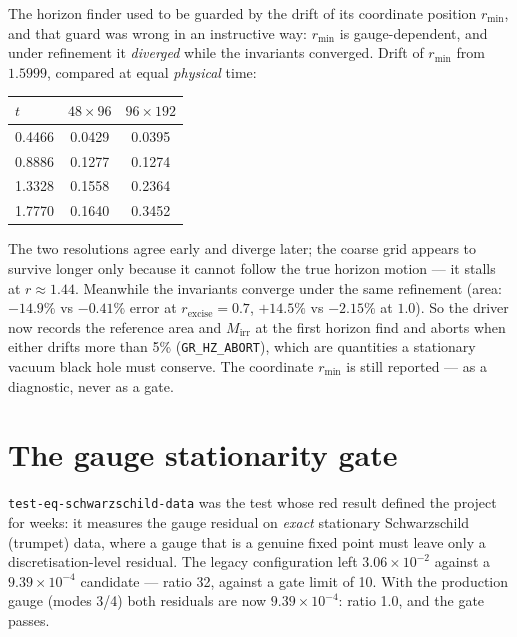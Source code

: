 \documentclass[11pt,openany]{book}
\begin{document}
The horizon finder used to be guarded by the drift of its coordinate
position $r_{\min}$, and that guard was wrong in an instructive way: $r_{\min}$
is gauge-dependent, and under refinement it \emph{diverged} while the
invariants converged. Drift of $r_{\min}$ from $1.5999$, compared at equal
\emph{physical} time:

\begin{center}
\begin{tabular}{@{}lcc@{}}
\toprule
$t$ & $48\times96$ & $96\times192$ \\
\midrule
0.4466 & 0.0429 & 0.0395 \\
0.8886 & 0.1277 & 0.1274 \\
1.3328 & 0.1558 & 0.2364 \\
1.7770 & 0.1640 & 0.3452 \\
\bottomrule
\end{tabular}
\end{center}

The two resolutions agree early and diverge later; the coarse grid appears to
survive longer only because it cannot follow the true horizon motion --- it
stalls at $r \approx 1.44$. Meanwhile the invariants converge under the same
refinement (area: $-14.9\%$ vs $-0.41\%$ error at $r_{\mathrm{excise}} =
0.7$, $+14.5\%$ vs $-2.15\%$ at $1.0$). So the driver now records the
reference area and $M_{\mathrm{irr}}$ at the first horizon find and aborts
when either drifts more than 5\% (\texttt{GR\_HZ\_ABORT}), which are
quantities a stationary vacuum black hole must conserve. The coordinate
$r_{\min}$ is still reported --- as a diagnostic, never as a gate.

\section{The gauge stationarity gate}
\label{sec:gauge-gate}

\texttt{test-eq-schwarzschild-data} was the test whose red result defined
the project for weeks: it measures the gauge residual on \emph{exact}
stationary Schwarzschild (trumpet) data, where a gauge that is a genuine
fixed point must leave only a discretisation-level residual. The legacy
configuration left $3.06\times10^{-2}$ against a $9.39\times10^{-4}$
candidate --- ratio 32, against a gate limit of 10. With the production
gauge (modes 3/4) both residuals are now $9.39\times10^{-4}$: ratio 1.0, and
the gate passes.
\end{document}

